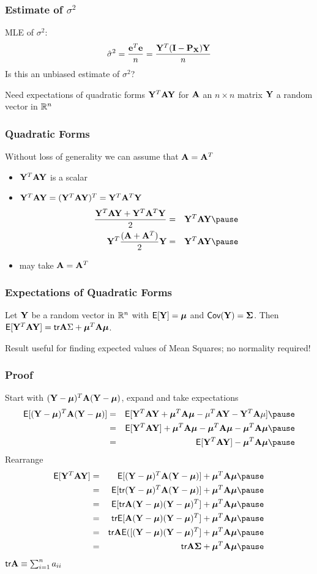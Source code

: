 \documentclass[handout]{beamer}
\begin{document}
\begin{frame}
  \frametitle{Estimate of $\sigma^2$}
MLE of $\sigma^2$:
  $${\hat{\sigma}}^2 = \frac{\mathbf{e}^T\mathbf{e}}{n} = \frac{\mathbf{Y}^T (\mathbf{I} - \mathbf{P}_{\mathbf{X}}) \mathbf{Y}}{n}$$
\pause
Is this an unbiased estimate of $\sigma^2$?
\pause

\vspace{1in}
Need expectations  of quadratic forms $\mathbf{Y}^T \mathbf{A} \mathbf{Y}$ for $\mathbf{A}$ an
 $n \times n$ matrix $\mathbf{Y}$ a random vector in $\mathbb{R}^n$
\end{frame}
\begin{frame}
  \frametitle{Quadratic Forms}
  Without loss of generality we can assume that $\mathbf{A} = \mathbf{A}^T$
\pause
  \begin{itemize}
  \item $\mathbf{Y}^T \mathbf{A} \mathbf{Y}$ is a scalar \pause
\item $\mathbf{Y}^T \mathbf{A} \mathbf{Y}  = (\mathbf{Y} ^T\mathbf{A}  \mathbf{Y})^T = \mathbf{Y}^T \mathbf{A}^T \mathbf{Y}$ \pause
  \begin{eqnarray*}
 \frac{\Y^T \A \Y  + \Y^T \A^T \Y}{2} & = &
\Y^T \A \Y  \pause \\
    \Y^T\frac{(\A + \A^T)}{2}\Y  & = & \Y^T \A \Y \pause
  \end{eqnarray*}
\item may take $\mathbf{A} = \mathbf{A}^T$
  \end{itemize}
\end{frame}
\begin{frame}
  \frametitle{Expectations of Quadratic Forms}
  \begin{theorem}
   Let  $\mathbf{Y}$ be a random vector in $\mathbb{R}^n$ with $\textsf{E}[\mathbf{Y}] = \boldsymbol{\mu}$ and
   $\textsf{Cov}(\mathbf{Y}) = \boldsymbol{\Sigma}$.  \pause Then $\textsf{E}[\mathbf{Y}^T \mathbf{A} \mathbf{Y}] = \textsf{tr} \mathbf{A} \Sigma + \boldsymbol{\mu}^T
   \mathbf{A} \boldsymbol{\mu}$.
  \end{theorem} \pause
Result useful for finding expected values of Mean Squares; no
normality required!
\end{frame}
\begin{frame}
  \frametitle{Proof}
Start with $(\mathbf{Y} - \boldsymbol{\mu})^T\mathbf{A} (\mathbf{Y} - \boldsymbol{\mu})$,  expand and take
expectations \pause
  \begin{eqnarray*}
\E [(\Y - \mub)^T\A (\Y - \mub)] & = & \E[\Y^T\A \Y + \mub^T\A \mub -
    \mu^T\A \Y - \Y^T \A \mu] \pause \\
 & = & \E[\Y^T\A \Y] + \mub^T\A \mub -
\mub^T\A \mub - \mub^T\A \mub \pause \\
 & = & \E[\Y^T\A \Y] - \mub^T\A \mub \pause
  \end{eqnarray*}
Rearrange \pause
 \begin{eqnarray*}
 \E[\Y^T\A \Y ] & = &  \E[ (\Y - \mub)^T\A (\Y - \mub)] + \mub^T\A
 \mub \pause \\
 & = & \E[ \tr (\Y - \mub)^T\A (\Y - \mub)] + \mub^T\A \mub  \pause\\
 & = & \E[ \tr \A (\Y - \mub) (\Y - \mub)^T] + \mub^T\A
 \mub \pause \\
 & = &\tr  \E[ \A (\Y - \mub) (\Y - \mub)^T] + \mub^T\A \mub \pause \\
 & = &\tr \A \E([ (\Y - \mub) (\Y - \mub)^T] + \mub^T\A \mub \pause \\
 & = &\tr \A \Sigmab + \mub^T\A \mub  \pause
\end{eqnarray*}
\alert<12>{{\small{$\textsf{tr} \mathbf{A} \equiv \sum_{i=1}^n a_{ii}$}}}
\end{frame}
\end{document}
